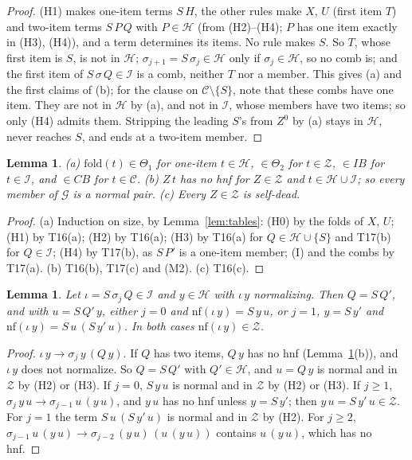 \documentclass[11pt]{amsart}
\newtheorem{lemma}[theorem]{Lemma}
\theoremstyle{definition}
\newcommand{\nf}{\mathrm{nf}}
\newcommand{\fold}{\mathrm{fold}}
\newcommand{\Hc}{\mathcal H}
\newcommand{\Ic}{\mathcal I}
\newcommand{\Gc}{\mathcal G}
\newcommand{\Cc}{\mathcal C}
\newcommand{\Zc}{\mathcal Z}
\begin{document}
\begin{proof}
(H1) makes one-item terms $S\,H$, the other rules make $X$, $U$ (first item $T$) and two-item
terms $S\,P\,Q$ with $P\in\Hc$ (from (H2)--(H4); $P$ has one item exactly in (H3), (H4)), and a term
determines its items. No rule makes $S$. So $T$, whose first item is $S$, is not in $\Hc$;
$\sigma_{j+1}=S\,\sigma_j\in\Hc$ only if $\sigma_j\in\Hc$, so no comb is; and the first item of $S\,\sigma\,Q\in\Ic$ is a
comb, neither $T$ nor a member. This gives (a) and the first claims of (b); for the clause on
$\Cc\setminus\{S\}$, note that these combs have one item. They are not in $\Hc$ by (a), and not in $\Ic$, whose
members have two items; so only (H4) admits them. Stripping the leading $S$'s from $Z^0$ by (a)
stays in $\Hc$, never reaches $S$, and ends at a two-item member.
\end{proof}

\begin{lemma}\label{lem:dead}
\textup{(a)} $\fold(t)\in\Theta_1$ for one-item $t\in\Hc$, $\in\Theta_2$ for $t\in\Zc$, $\in IB$
for $t\in\Ic$, and $\in CB$ for $t\in\Cc$.
\textup{(b)} $Z\,t$ has no hnf for $Z\in\Zc$ and $t\in\Hc\cup\Ic$; so every member of $\Gc$ is a
normal pair.
\textup{(c)} Every $Z\in\Zc$ is self-dead.
\end{lemma}

\begin{proof}
(a) Induction on size, by Lemma~\ref{lem:tables}: (H0) by the folds of $X$, $U$; (H1) by T16(a);
(H2) by T16(a); (H3) by T16(a) for $Q\in\Hc\cup\{S\}$ and T17(b) for $Q\in\Ic$; (H4) by T17(b), as
$S\,P'$ is a one-item member; (I) and the combs by T17(a). (b) T16(b), T17(c) and (M2). (c) T16(c).
\end{proof}

\begin{lemma}\label{lem:inert}
Let $\iota=S\,\sigma_j\,Q\in\Ic$ and $y\in\Hc$ with $\iota\,y$ normalizing. Then $Q=S\,Q'$, and with
$u=S\,Q'\,y$, either $j=0$ and $\nf(\iota\,y)=S\,y\,u$, or $j=1$, $y=S\,y'$ and
$\nf(\iota\,y)=S\,u\,(S\,y'\,u)$. In both cases $\nf(\iota\,y)\in\Zc$.
\end{lemma}

\begin{proof}
$\iota\,y\to\sigma_j\,y\,(Q\,y)$. If $Q$ has two items, $Q\,y$ has no hnf (Lemma~\ref{lem:dead}(b)), and
$\iota\,y$ does not normalize. So
$Q=S\,Q'$ with $Q'\in\Hc$, and $u=Q\,y$ is normal and in $\Zc$ by (H2) or (H3). If $j=0$,
$S\,y\,u$ is normal and in $\Zc$ by (H2) or (H3). If $j\ge1$, $\sigma_j\,y\,u\to \sigma_{j-1}\,u\,(y\,u)$, and
$y\,u$ has no hnf unless $y=S\,y'$; then $y\,u=S\,y'\,u\in\Zc$. For $j=1$ the term
$S\,u\,(S\,y'\,u)$ is normal and in $\Zc$ by (H2). For $j\ge2$,
$\sigma_{j-1}\,u\,(y\,u)\to \sigma_{j-2}\,(y\,u)\,(u\,(y\,u))$ contains $u\,(y\,u)$, which has no hnf.
\end{proof}
\end{document}
